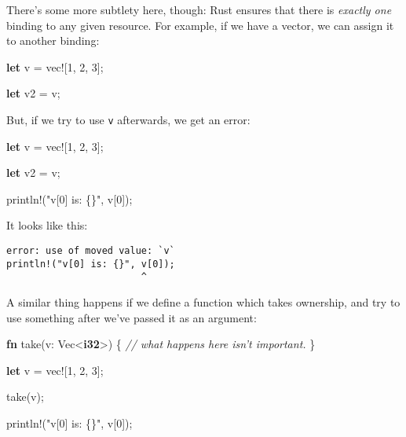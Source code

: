 \documentclass[a4paper,]{book}
\newenvironment{Shaded}{\begin{snugshade}}{\end{snugshade}}
\newcommand{\KeywordTok}[1]{\textcolor[rgb]{0.13,0.29,0.53}{\textbf{{#1}}}}
\newcommand{\DecValTok}[1]{\textcolor[rgb]{0.00,0.00,0.81}{{#1}}}
\newcommand{\StringTok}[1]{\textcolor[rgb]{0.31,0.60,0.02}{{#1}}}
\newcommand{\CommentTok}[1]{\textcolor[rgb]{0.56,0.35,0.01}{\textit{{#1}}}}
\newcommand{\OtherTok}[1]{\textcolor[rgb]{0.56,0.35,0.01}{{#1}}}
\newcommand{\NormalTok}[1]{{#1}}
\begin{document}

There's some more subtlety here, though: Rust ensures that there is
\emph{exactly one} binding to any given resource. For example, if we
have a vector, we can assign it to another binding:

\begin{Shaded}
\begin{Highlighting}[]
\KeywordTok{let} \NormalTok{v = }\OtherTok{vec!}\NormalTok{[}\DecValTok{1}\NormalTok{, }\DecValTok{2}\NormalTok{, }\DecValTok{3}\NormalTok{];}

\KeywordTok{let} \NormalTok{v2 = v;}
\end{Highlighting}
\end{Shaded}

But, if we try to use \texttt{v} afterwards, we get an error:

\begin{Shaded}
\begin{Highlighting}[]
\KeywordTok{let} \NormalTok{v = }\OtherTok{vec!}\NormalTok{[}\DecValTok{1}\NormalTok{, }\DecValTok{2}\NormalTok{, }\DecValTok{3}\NormalTok{];}

\KeywordTok{let} \NormalTok{v2 = v;}

\OtherTok{println!}\NormalTok{(}\StringTok{"v[0] is: \{\}"}\NormalTok{, v[}\DecValTok{0}\NormalTok{]);}
\end{Highlighting}
\end{Shaded}

It looks like this:

\begin{verbatim}
error: use of moved value: `v`
println!("v[0] is: {}", v[0]);
                        ^
\end{verbatim}

A similar thing happens if we define a function which takes ownership,
and try to use something after we've passed it as an argument:

\begin{Shaded}
\begin{Highlighting}[]
\KeywordTok{fn} \NormalTok{take(v: Vec<}\KeywordTok{i32}\NormalTok{>) \{}
    \CommentTok{// what happens here isn’t important.}
\NormalTok{\}}

\KeywordTok{let} \NormalTok{v = }\OtherTok{vec!}\NormalTok{[}\DecValTok{1}\NormalTok{, }\DecValTok{2}\NormalTok{, }\DecValTok{3}\NormalTok{];}

\NormalTok{take(v);}

\OtherTok{println!}\NormalTok{(}\StringTok{"v[0] is: \{\}"}\NormalTok{, v[}\DecValTok{0}\NormalTok{]);}
\end{Highlighting}
\end{Shaded}
\end{document}
